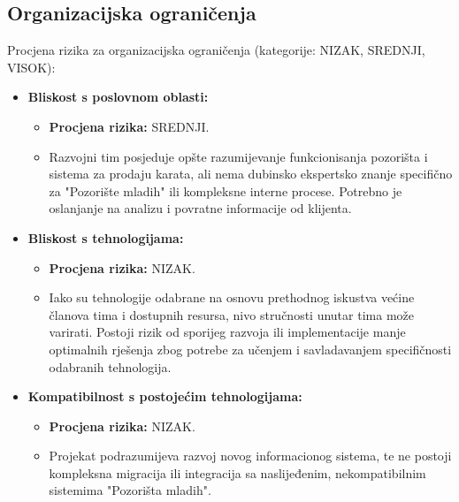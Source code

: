 \sloppy
\subsection{Organizacijska ograničenja}



Procjena rizika za organizacijska ograničenja (kategorije: NIZAK, SREDNJI, VISOK):

\begin{itemize}
    \item \textbf{Bliskost s poslovnom oblasti:}
    
    \begin{itemize}
        \item \textbf{Procjena rizika:} SREDNJI. 
        
        \item Razvojni tim posjeduje opšte razumijevanje funkcionisanja pozorišta i sistema za prodaju karata, ali nema dubinsko ekspertsko znanje specifično za "Pozorište mladih" ili kompleksne interne procese. Potrebno je oslanjanje na analizu i povratne informacije od klijenta.
    \end{itemize}
    
    \item \textbf{Bliskost s tehnologijama:}
    
    \begin{itemize}
        \item \textbf{Procjena rizika:} NIZAK. 
        
        \item Iako su tehnologije odabrane na osnovu prethodnog iskustva većine članova tima i dostupnih resursa, nivo stručnosti unutar tima može varirati. Postoji rizik od sporijeg razvoja ili implementacije manje optimalnih rješenja zbog potrebe za učenjem i savladavanjem specifičnosti odabranih tehnologija.
    \end{itemize}
    
    \item \textbf{Kompatibilnost s postojećim tehnologijama:}

    \begin{itemize}
        \item \textbf{Procjena rizika:} NIZAK. 
        
        \item Projekat podrazumijeva razvoj novog informacionog sistema, te ne postoji kompleksna migracija ili integracija sa naslijeđenim, nekompatibilnim sistemima "Pozorišta mladih".
    \end{itemize}
    

\end{itemize}
